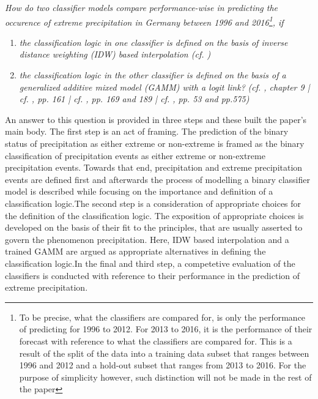 \documentclass[
  12pt,
]{article}
\begin{document}
\begin{mdframed}[frametitle={Research Question}]
\begin{adjustwidth}{0.5cm}{0cm} 
\textit{How do two classifier models compare performance-wise in predicting the occurence of extreme precipitation in Germany between 1996 and 2016\footnote{To be precise, what the classifiers are compared for, is only the performance of predicting for 1996 to 2012. For 2013 to 2016, it is the performance of their forecast with reference to what the classifiers are compared for. This is a result of the split of the data into a training data subset that ranges between 1996 and 2012 and a hold-out subset that ranges from 2013 to 2016. For the purpose of simplicity however, such distinction will not be made in the rest of the paper}, if} 
\begin{enumerate}
\item \textit{the classification logic in one classifier is defined on the basis of inverse distance weighting (IDW) based interpolation (cf. \cite{Wikle.2019})}
\item \textit{the classification logic in the other classifier is defined on the basis of a generalized additive mixed model (GAMM) with a logit link?} \textit{(cf. \cite{Zumel.2014}, chapter 9 | cf. \cite{Wood.2017}, pp. 161 | cf. \cite{Wikle.2019}, pp. 169 and 189 | cf. \cite{Fahrmeir.2021}, pp. 53 and pp.575)}
\end{enumerate}
\end{adjustwidth}
\label{research_question}
\end{mdframed}

An answer to this question is provided in three steps and these built
the paper's main body. The first step is an act of framing. The
prediction of the binary status of precipitation as either extreme or
non-extreme is framed as the binary classification of precipitation
events as either extreme or non-extreme precipitation events. Towards
that end, precipitation and extreme precipitation events are defined
first and afterwards the process of modelling a binary classifier model
is described while focusing on the importance and definition of a
classification logic.\newline The second step is a consideration of
appropriate choices for the definition of the classification logic. The
exposition of appropriate choices is developed on the basis of their fit
to the principles, that are usually asserted to govern the phenomenon
precipitation. Here, IDW based interpolation and a trained GAMM are
argued as appropriate alternatives in defining the classification
logic.\newline In the final and third step, a competetive evaluation of
the classifiers is conducted with reference to their performance in the
prediction of extreme precipitation.
\end{document}
